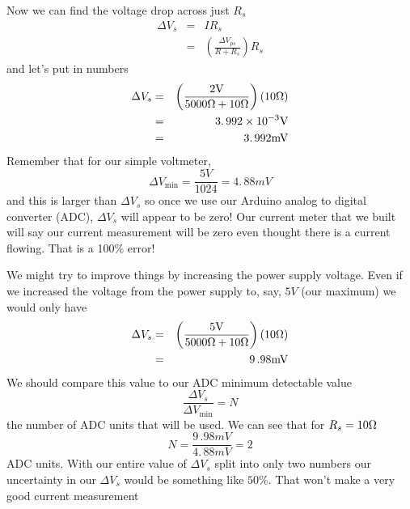 Now we can find the voltage drop across just $R_{s}$%
\begin{eqnarray*}
\Delta V_{s} &=&IR_{s} \\
&=&\left( \frac{\Delta V_{ps}}{R+R_{s}}\right) R_{s}
\end{eqnarray*}%
and let's put in numbers%
\begin{eqnarray*}
\Delta V_{s} &=&\left( \frac{2\unit{V}}{5000\unit{%
\Omega%
}+10\unit{%
\Omega%
}}\right) \left( 10\unit{%
\Omega%
}\right) \\
&=&3.\,\allowbreak 992\times 10^{-3}\unit{V} \\
&=&3.\,\allowbreak 992\unit{mV}
\end{eqnarray*}%
Remember that for our simple voltmeter, 
\begin{equation*}
\Delta V_{\min }=\frac{5\unit{V}}{1024}=4.\,\allowbreak 88\unit{mV}
\end{equation*}%
and this is larger than $\Delta V_{s}$ so once we use our Arduino analog to
digital converter (ADC), $\Delta V_{s}$ will appear to be zero! Our current
meter that we built will say our current measurement will be zero even
thought there is a current flowing. That is a 100\% error!

We might try to improve things by increasing the power supply voltage. Even
if we increased the voltage from the power supply to, say, $5\unit{V}$ (our
maximum) we would only have 
\begin{eqnarray*}
\Delta V_{s} &=&\left( \frac{5\unit{V}}{5000\unit{%
\Omega%
}+10\unit{%
\Omega%
}}\right) \left( 10\unit{%
\Omega%
}\right) \\
&=&9\,.98\unit{mV}
\end{eqnarray*}%
We should compare this value to our ADC minimum detectable value 
\begin{equation*}
\frac{\Delta V_{s}}{\Delta V_{\min }}=N
\end{equation*}%
the number of ADC units that will be used. We can see that for $R_{s}=10%
\unit{%
\Omega%
}$ 
\begin{equation*}
N=\frac{9\,.98\unit{mV}}{4.\,\allowbreak 88\unit{mV}}=2
\end{equation*}%
ADC units. With our entire value of $\Delta V_{s}$ split into only two
numbers our uncertainty in our $\Delta V_{s}$ would be something like $50\%.$
That won't make a very good current measurement

